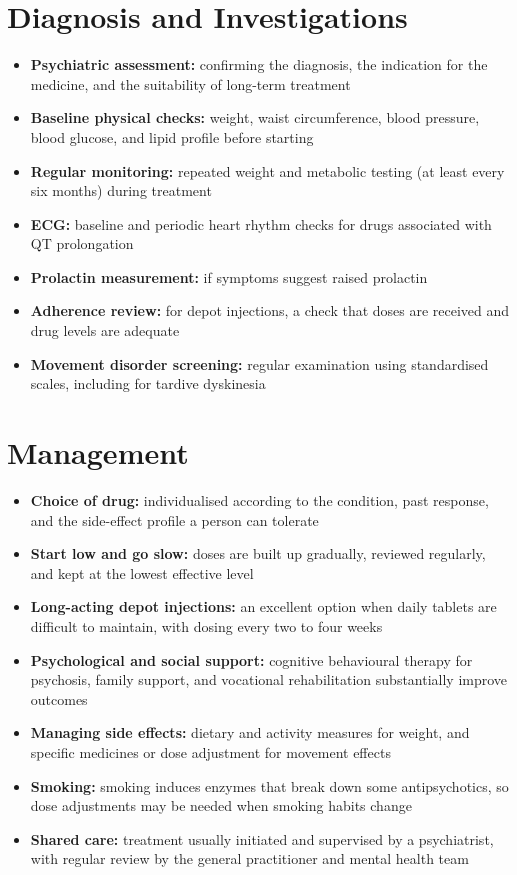 \section*{Diagnosis and Investigations}
\begin{itemize}
    \item \textbf{Psychiatric assessment:} confirming the diagnosis, the indication for the medicine, and the suitability of long-term treatment
    \item \textbf{Baseline physical checks:} weight, waist circumference, blood pressure, blood glucose, and lipid profile before starting
    \item \textbf{Regular monitoring:} repeated weight and metabolic testing (at least every six months) during treatment
    \item \textbf{ECG:} baseline and periodic heart rhythm checks for drugs associated with QT prolongation
    \item \textbf{Prolactin measurement:} if symptoms suggest raised prolactin
    \item \textbf{Adherence review:} for depot injections, a check that doses are received and drug levels are adequate
    \item \textbf{Movement disorder screening:} regular examination using standardised scales, including for tardive dyskinesia
\end{itemize}

\section*{Management}
\begin{itemize}
    \item \textbf{Choice of drug:} individualised according to the condition, past response, and the side-effect profile a person can tolerate
    \item \textbf{Start low and go slow:} doses are built up gradually, reviewed regularly, and kept at the lowest effective level
    \item \textbf{Long-acting depot injections:} an excellent option when daily tablets are difficult to maintain, with dosing every two to four weeks
    \item \textbf{Psychological and social support:} cognitive behavioural therapy for psychosis, family support, and vocational rehabilitation substantially improve outcomes
    \item \textbf{Managing side effects:} dietary and activity measures for weight, and specific medicines or dose adjustment for movement effects
    \item \textbf{Smoking:} smoking induces enzymes that break down some antipsychotics, so dose adjustments may be needed when smoking habits change
    \item \textbf{Shared care:} treatment usually initiated and supervised by a psychiatrist, with regular review by the general practitioner and mental health team
\end{itemize}

